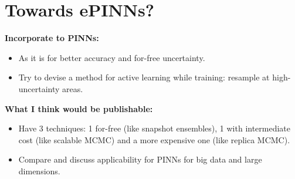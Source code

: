 \section{Towards ePINNs?}
\noindent
\textbf{Incorporate to PINNs:}
\begin{itemize}
	\item As it is for better accuracy and for-free uncertainty.
	\item Try to devise a method for active learning while training: resample at high-uncertainty areas.
\end{itemize}
\noindent
\textbf{What I think would be publishable:}
\begin{itemize}
	\item Have 3 techniques: 1 for-free (like snapshot ensembles), 1 with intermediate cost (like scalable MCMC) and a more expensive one (like replica MCMC). 
	\item Compare and discuss applicability for PINNs for big data and large dimensions.
\end{itemize}


	
\printbibliography[heading=bibintoc,title={References}]
	
